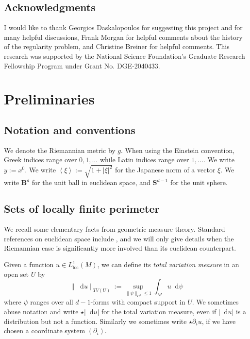 \documentclass[reqno,11pt]{amsart}
\newcommand{\Sph}{\mathbf S}
\newcommand{\Ball}{\mathbf{B}}
\newcommand*\dif{\mathop{}\!\mathrm{d}}
\newcommand{\dfn}[1]{\emph{#1}\index{#1}}
\newcommand{\loc}{\mathrm{loc}}
\def\Japan#1{\left \langle #1 \right \rangle}
\theoremstyle{definition}
\numberwithin{equation}{section}
\begin{document}

\subsection{Acknowledgments}
I would like to thank Georgios Daskalopoulos for suggesting this project and for many helpful discussions, Frank Morgan for helpful comments about the history of the regularity problem, and Christine Breiner for helpful comments.
This research was supported by the National Science Foundation's Graduate Research Fellowship Program under Grant No. DGE-2040433.

\section{Preliminaries}\label{Prelims}
\subsection{Notation and conventions}
We denote the Riemannian metric by $g$.
When using the Einstein convention, Greek indices range over $0, 1, \dots$ while Latin indices range over $1, \dots$.
We write $y := x^0$.
We write $\Japan \xi := \sqrt{1 + |\xi|^2}$ for the Japanese norm of a vector $\xi$.
We write $\Ball^d$ for the unit ball in euclidean space, and $\Sph^{d - 1}$ for the unit sphere.

\subsection{Sets of locally finite perimeter}
We recall some elementary facts from geometric measure theory.
Standard references on euclidean space include \cite{simon1983GMT,Giusti77}, and we will only give details when the Riemannian case is significantly more involved than its euclidean counterpart.

Given a function $u \in L^1_\loc(M)$, we can define its \dfn{total variation measure} in an open set $U$ by
$$\|\dif u\|_{TV(U)} := \sup_{\|\psi\|_{C^0} \leq 1} \int_M u \dif \psi$$
where $\psi$ ranges over all $d-1$-forms with compact support in $U$.
We sometimes abuse notation and write $\star |\dif u|$ for the total variation measure, even if $|\dif u|$ is a distribution but not a function.
Similarly we sometimes write $\star \partial_i u$, if we have chosen a coordinate system $(\partial_i)$.
\end{document}
